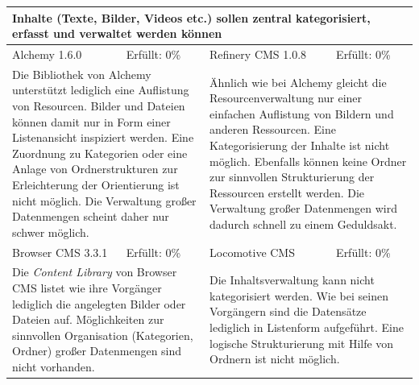 \begin{tabular}[!ht]{|l|l|l|l|}
\hline
\multicolumn{4}{|p{15cm}|}{\textbf{Inhalte (Texte, Bilder, Videos etc.) sollen zentral kategorisiert, erfasst und verwaltet werden können}} \\
\hline
  Alchemy 1.6.0 & \cellcolor{red}Erfüllt: 0\% & Refinery CMS 1.0.8 & \cellcolor{red}Erfüllt: 0\% \\
  \hline
  \multicolumn{2}{|p{7.5cm}|}{Die Bibliothek von Alchemy unterstützt lediglich eine Auflistung von Resourcen. Bilder und Dateien können damit nur in Form einer Listenansicht inspiziert werden. Eine Zuordnung zu Kategorien oder eine Anlage von Ordnerstrukturen zur Erleichterung der Orientierung ist nicht möglich. Die Verwaltung großer Datenmengen scheint daher nur schwer möglich.}
   & \multicolumn{2}{p{7.5cm}|}{Ähnlich wie bei Alchemy gleicht die Resourcenverwaltung nur einer einfachen Auflistung von Bildern und anderen Ressourcen. Eine Kategorisierung der Inhalte ist nicht möglich. Ebenfalls können keine Ordner zur sinnvollen Strukturierung der Ressourcen erstellt werden. Die Verwaltung großer Datenmengen wird dadurch schnell zu einem Geduldsakt.} \\
  \hline
  Browser CMS 3.3.1 & \cellcolor{red}Erfüllt: 0\% & Locomotive CMS & \cellcolor{red}Erfüllt: 0\% \\
  \hline
  \multicolumn{2}{|p{7.5cm}|}{Die \emph{Content Library} von Browser CMS listet wie ihre Vorgänger lediglich die angelegten Bilder oder Dateien auf. Möglichkeiten zur sinnvollen Organisation (Kategorien, Ordner) großer Datenmengen sind nicht vorhanden.} & \multicolumn{2}{p{7.5cm}|}{Die Inhaltsverwaltung kann nicht kategorisiert werden. Wie bei seinen Vorgängern sind die Datensätze lediglich in Listenform aufgeführt. Eine logische Strukturierung mit Hilfe von Ordnern ist nicht möglich.} \\
\hline
\end{tabular}
\newline
\newline
\newline

